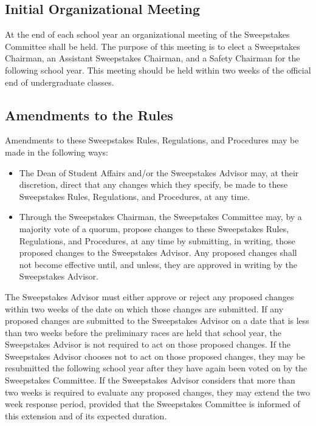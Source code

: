 \subsection{Initial Organizational Meeting}

	At the end of each school year an organizational meeting of the Sweepstakes Committee shall be held. The purpose of this meeting is to elect a Sweepstakes Chairman, an Assistant Sweepstakes Chairman, and a Safety Chairman for the following school year. This meeting should be held within two weeks of the official end of undergraduate classes. 

\subsection{Amendments to the Rules}

	Amendments to these Sweepstakes Rules, Regulations, and Procedures may be made in the following ways:

	\begin{itemize}

		\item
		The Dean of Student Affairs and/or the Sweepstakes Advisor may, at their discretion, direct that any changes which they specify, be made to these Sweepstakes Rules, Regulations, and Procedures, at any time.

		\item
		Through the Sweepstakes Chairman, the Sweepstakes Committee may, by a majority vote of a quorum, propose changes to these Sweepstakes Rules, Regulations, and Procedures, at any time by submitting, in writing, those proposed changes to the Sweepstakes Advisor. Any proposed changes shall not become effective until, and unless, they are approved in writing by the Sweepstakes Advisor.

	\end{itemize}

	The Sweepstakes Advisor must either approve or reject any proposed changes within two weeks of the date on which those changes are submitted. If any proposed changes are submitted to the Sweepstakes Advisor on a date that is less than two weeks before the preliminary races are held that school year, the Sweepstakes Advisor is not required to act on those proposed changes. If the Sweepstakes Advisor chooses not to act on those proposed changes, they may be resubmitted the following school year after they have again been voted on by the Sweepstakes Committee. If the Sweepstakes Advisor considers that more than two weeks is required to evaluate any proposed changes, they may extend the two week response period, provided that the Sweepstakes Committee is informed of this extension and of its expected duration.

